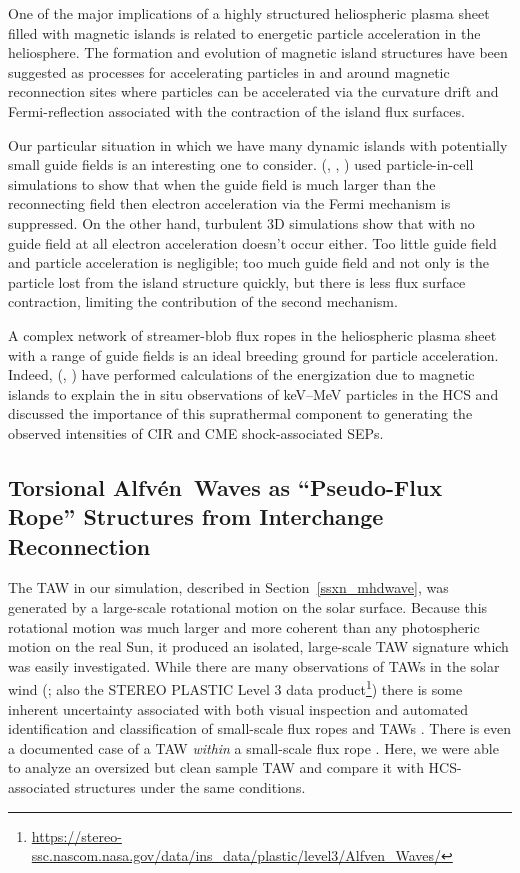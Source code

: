 \documentclass[preprint]{aastex62}
\newcommand{\Alfven}{Alfv\'{e}n\ }
\begin{document}
One of the major implications of a highly structured heliospheric
plasma sheet filled with magnetic islands is related to energetic
particle acceleration in the heliosphere. The formation and evolution
of magnetic island structures have been suggested as processes for
accelerating particles in and around magnetic reconnection sites
\citep[e.g.][and references therein]{Drake2006b, Dahlin2014,
Guidoni2016, Khabarova2016} where particles can be accelerated via
the curvature drift and Fermi-reflection associated with the
contraction of the island flux surfaces.

Our particular situation
in which we have many dynamic islands with potentially small guide
fields is an interesting one to consider. \citeauthor{Dahlin2014}
(\citeyear{Dahlin2014}, \citeyear{Dahlin2015}, \citeyear{Dahlin2016})
used particle-in-cell simulations to show that when the guide field is
much larger than the reconnecting field then electron acceleration
via the Fermi mechanism is suppressed. On the other hand, turbulent 3D simulations show that with no guide field at all electron
acceleration doesn't occur either. Too little guide field
and particle acceleration is negligible; too much guide field and
not only is the particle lost from the island structure quickly,
but there is less flux surface contraction, limiting the contribution
of the second mechanism.

A complex network of streamer-blob  flux ropes in
the heliospheric plasma sheet with a range of guide fields 
is an ideal breeding ground for particle acceleration. Indeed, 
\citeauthor{Khabarova2015} (\citeyear{Khabarova2015},
\citeyear{Khabarova2016}) have performed calculations
of the energization due to magnetic islands to explain the in situ
observations of keV--MeV particles in the HCS and discussed the
importance of this suprathermal component to generating the observed
intensities of CIR and CME shock-associated SEPs.


\subsection{Torsional \Alfven Waves as ``Pseudo-Flux Rope'' Structures from Interchange Reconnection}

The TAW in our simulation, described in Section~\ref{ssxn_mhdwave},
was generated by a large-scale rotational motion on the solar
surface. Because this rotational motion was much larger and more coherent
than any photospheric motion on the real Sun, it produced an isolated, large-scale 
TAW signature which was easily investigated. 
While there are many observations of TAWs in the solar wind
(\citealt{Yu2016}; also the STEREO PLASTIC Level 3 data 
product\footnote{\url{https://stereo-ssc.nascom.nasa.gov/data/ins_data/plastic/level3/Alfven_Waves/}}) 
there is some inherent uncertainty associated with both visual 
inspection and automated identification and classification of 
small-scale flux ropes and TAWs \citep[e.g.][]{Feng2010comment, 
Cartwright2010reply, Yu2014}. There is even a documented case 
of a TAW \textit{within} a small-scale flux rope \citep{Gosling2010taw}. Here, we were able to analyze an oversized but clean sample 
TAW and compare it with HCS-associated structures under the same conditions.
\end{document}
